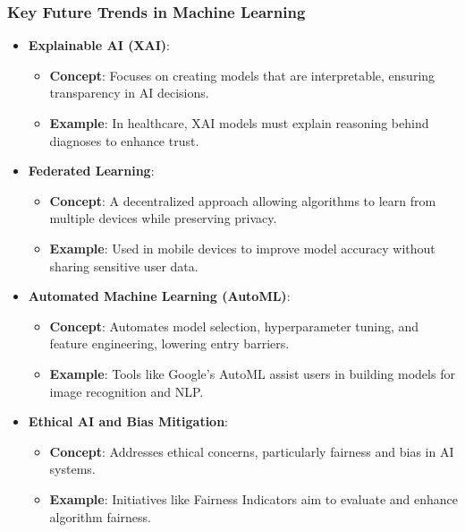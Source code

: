 \documentclass[aspectratio=169]{beamer}
\begin{document}
\begin{frame}[fragile]
    \frametitle{Key Future Trends in Machine Learning}
    \begin{itemize}
        \item \textbf{Explainable AI (XAI)}:
        \begin{itemize}
            \item \textbf{Concept}: Focuses on creating models that are interpretable, ensuring transparency in AI decisions.
            \item \textbf{Example}: In healthcare, XAI models must explain reasoning behind diagnoses to enhance trust.
        \end{itemize}

        \item \textbf{Federated Learning}:
        \begin{itemize}
            \item \textbf{Concept}: A decentralized approach allowing algorithms to learn from multiple devices while preserving privacy.
            \item \textbf{Example}: Used in mobile devices to improve model accuracy without sharing sensitive user data.
        \end{itemize}

        \item \textbf{Automated Machine Learning (AutoML)}:
        \begin{itemize}
            \item \textbf{Concept}: Automates model selection, hyperparameter tuning, and feature engineering, lowering entry barriers.
            \item \textbf{Example}: Tools like Google’s AutoML assist users in building models for image recognition and NLP.
        \end{itemize}

        \item \textbf{Ethical AI and Bias Mitigation}:
        \begin{itemize}
            \item \textbf{Concept}: Addresses ethical concerns, particularly fairness and bias in AI systems.
            \item \textbf{Example}: Initiatives like Fairness Indicators aim to evaluate and enhance algorithm fairness.
        \end{itemize}
    \end{itemize}
\end{frame}
\end{document}
